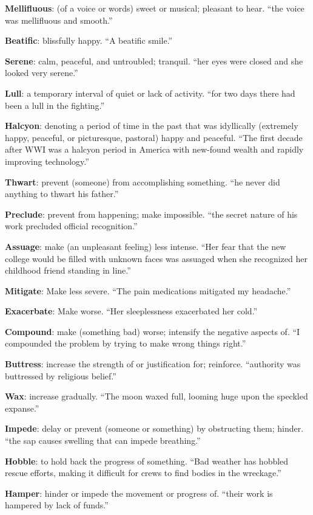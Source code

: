 \documentclass[12pt, a4paper]{ximera}
\begin{document}
\textbf{Mellifluous}: (of a voice or words) sweet or musical; pleasant to hear. ``the voice was mellifluous and smooth.''

\textbf{Beatific}: blissfully happy. ``A beatific smile.''

\textbf{Serene}: calm, peaceful, and untroubled; tranquil. ``her eyes were closed and she looked very serene.''

\textbf{Lull}: a temporary interval of quiet or lack of activity. ``for two days there had been a lull in the fighting.''

\textbf{Halcyon}: denoting a period of time in the past that was idyllically (extremely happy, peaceful, or picturesque, pastoral) happy and peaceful. ``The first decade after WWI was a halcyon period in America with new-found wealth and rapidly improving technology.''

\textbf{Thwart}: prevent (someone) from accomplishing something. ``he never did anything to thwart his father.''

\textbf{Preclude}: prevent from happening; make impossible. ``the secret nature of his work precluded official recognition.''

\textbf{Assuage}: make (an unpleasant feeling) less intense. ``Her fear that the new college would be filled with unknown faces was assuaged when she recognized her childhood friend standing in line.''

\textbf{Mitigate}: Make less severe. ``The pain medications mitigated my headache.''

\textbf{Exacerbate}: Make worse. ``Her sleeplessness exacerbated her cold.''

\textbf{Compound}: make (something bad) worse; intensify the negative aspects of. ``I compounded the problem by trying to make wrong things right.''

\textbf{Buttress}: increase the strength of or justification for; reinforce. ``authority was buttressed by religious belief.''

\textbf{Wax}: increase gradually. ``The moon waxed full, looming huge upon the speckled expanse.''

\textbf{Impede}: delay or prevent (someone or something) by obstructing them; hinder. ``the sap causes swelling that can impede breathing.''

\textbf{Hobble}: to hold back the progress of something. ``Bad weather has hobbled rescue efforts, making it difficult for crews to find bodies in the wreckage.''

\textbf{Hamper}: hinder or impede the movement or progress of. ``their work is hampered by lack of funds.''
\end{document}
